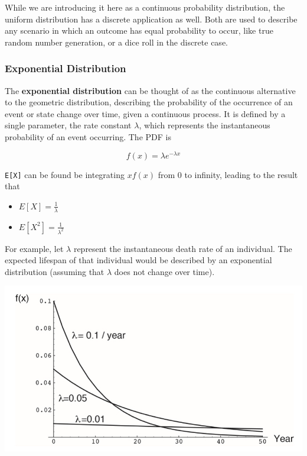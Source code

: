 \documentclass[]{book}
\providecommand{\tightlist}{%
  \setlength{\itemsep}{0pt}\setlength{\parskip}{0pt}}
\begin{document}
While we are introducing it here as a continuous probability distribution, the uniform distribution has a discrete application as well. Both are used to describe any scenario in which an outcome has equal probability to occur, like true random number generation, or a dice roll in the discrete case.

\hypertarget{exponential-distribution}{%
\subsubsection{\texorpdfstring{\textbf{Exponential Distribution}}{Exponential Distribution}}\label{exponential-distribution}}

The \textbf{exponential distribution} can be thought of as the continuous alternative to the geometric distribution, describing the probability of the occurrence of an event or state change over time, given a continuous process. It is defined by a single parameter, the rate constant \(\lambda\), which represents the instantaneous probability of an event occurring. The PDF is

\[f(x)=\lambda e^{-\lambda x}\]

\texttt{E{[}X{]}} can be found be integrating \(xf(x)\) from 0 to infinity, leading to the result that

\begin{itemize}
\tightlist
\item
  \(E[X] = \frac{1}{\lambda}\)
\item
  \(E[X^2] = \frac{1}{\lambda^2}\)
\end{itemize}

For example, let \(\lambda\) represent the instantaneous death rate of an individual. The expected lifespan of that individual would be described by an exponential distribution (assuming that \(\lambda\) does not change over time).

\begin{center}\includegraphics[width=0.7\linewidth]{images/prob.020} \end{center}
\end{document}
